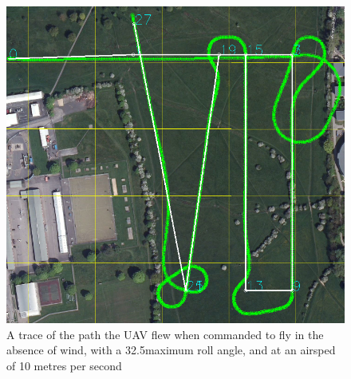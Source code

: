 \begin{figure}[htbp!] 
\centering    
\includegraphics[width=\textwidth]{32_10_NoWind}
\caption{A trace of the path the UAV flew when commanded to fly in the absence of wind, with a 32.5\degree  maximum roll angle, and at an airsped of 10 metres per second}
\end{figure}